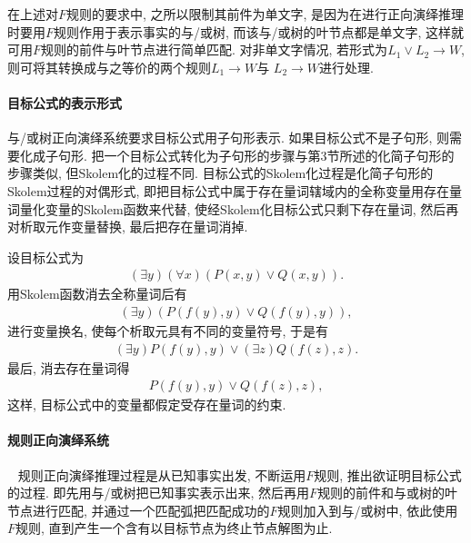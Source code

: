 在上述对$F$规则的要求中, 之所以限制其前件为单文字, 是因为在进行正向演绎推理时要用$F$规则作用于表示事实的与/或树, 而该与/或树的叶节点都是单文字, 这样就可用$F$规则的前件与叶节点进行简单匹配.
对非单文字情况, 若形式为$L_1\vee L_2\rightarrow W$, 则可将其转换成与之等价的两个规则$L_1\rightarrow W$与 $L_2\rightarrow W$进行处理.
\paragraph{目标公式的表示形式}
与/或树正向演绎系统要求目标公式用子句形表示. 如果目标公式不是子句形, 则需要化成子句形. 把一个目标公式转化为子句形的步骤与第3节所述的化简子句形的步骤类似, 但Skolem化的过程不同. 目标公式的Skolem化过程是化简子句形的Skolem过程的对偶形式, 即把目标公式中属于存在量词辖域内的全称变量用存在量词量化变量的Skolem函数来代替, 使经Skolem化目标公式只剩下存在量词, 然后再对析取元作变量替换, 最后把存在量词消掉.
\begin{example}
设目标公式为
\begin{align}
  (\exists  y) (\forall x) (P(x, y)\vee Q(x, y)).
\end{align}
用Skolem函数消去全称量词后有
\begin{align}
  (\exists  y)(P(f(y), y)\vee Q(f(y), y)),
\end{align}
进行变量换名, 使每个析取元具有不同的变量符号, 于是有
\begin{align}
  (\exists  y)P(f(y), y)\vee (\exists  z)Q(f(z), z).
\end{align}
最后, 消去存在量词得
\begin{align}
  P(f(y), y)\vee Q(f(z), z),
\end{align}
这样, 目标公式中的变量都假定受存在量词的约束.
\end{example}
\paragraph{规则正向演绎系统}~{}
规则正向演绎推理过程是从已知事实出发, 不断运用$F$规则, 推出欲证明目标公式的过程. 即先用与/或树把已知事实表示出来, 然后再用$F$规则的前件和与或树的叶节点进行匹配, 并通过一个匹配弧把匹配成功的$F$规则加入到与/或树中, 依此使用$F$规则, 直到产生一个含有以目标节点为终止节点解图为止.

